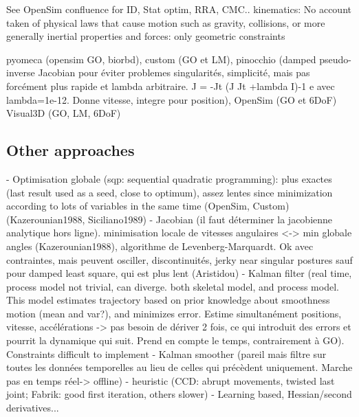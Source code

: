 See OpenSim confluence for ID, Stat optim, RRA, CMC..
kinematics: No account taken of physical laws that cause motion such as gravity, collisions, or more generally inertial properties and forces: only geometric constraints









pyomeca (opensim GO, biorbd), 
custom (GO et LM), 
pinocchio (damped pseudo-inverse Jacobian pour éviter problemes singularités, simplicité, mais pas forcément plus rapide et lambda arbitraire. J = -Jt (J Jt +lambda I)-1 e avec lambda=1e-12. Donne vitesse, integre pour position), 
OpenSim (GO et 6DoF)
Visual3D (GO, LM, 6DoF)






\subsection{Other approaches}

\cite{DeGroote2008,Aristidou2017}
- Optimisation globale (sqp: sequential quadratic programming): plus exactes (last result used as a seed, close to optimum), assez lentes since minimization according to lots of variables in the same time (OpenSim, Custom) (Kazerounian1988, Siciliano1989)
- Jacobian (il faut déterminer la jacobienne analytique hors ligne). minimisation locale de vitesses angulaires <-> min globale angles (Kazerounian1988), algorithme de Levenberg-Marquardt. Ok avec contraintes, mais peuvent osciller, discontinuités, jerky near singular postures sauf pour damped least square, qui est plus lent (Aristidou)
- Kalman filter (real time, process model not trivial, can diverge. both skeletal model, and process model. This model estimates trajectory based on prior knowledge about smoothness motion (mean and var?), and minimizes error. Estime simultanément positions, vitesse, accélérations -> pas besoin de dériver 2 fois, ce qui introduit des errors et pourrit la dynamique qui suit. Prend en compte le temps, contrairement à GO). Constraints difficult to implement
- Kalman smoother (pareil mais filtre sur toutes les données temporelles au lieu de celles qui précèdent uniquement. Marche pas en temps réel-> offline)
- heuristic (CCD: abrupt movements, twisted last joint; Fabrik: good first iteration, others slower)
- Learning based, Hessian/second derivatives...


 






